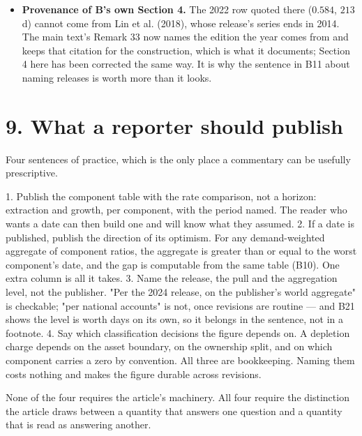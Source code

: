 \documentclass[11pt]{article}
\begin{document}
\begin{itemize}
\item \textbf{Provenance of B's own Section 4.} The 2022 row quoted there (\(0.584\), \(213\) d) cannot come from Lin et al. (2018), whose release's series ends in 2014. The main text's Remark 33 now names the edition the year comes from and keeps that citation for the construction, which is what it documents; Section 4 here has been corrected the same way. It is why the sentence in B11 about naming releases is worth more than it looks.
\end{itemize}

\vspace{0.8em}

\vspace{0.8em}

\section*{9. What a reporter should publish}\label{9-what-a-reporter-should-publish}

Four sentences of practice, which is the only place a commentary can be usefully prescriptive.

1. Publish the component table with the rate comparison, not a horizon: extraction and growth, per component, with the period named. The reader who wants a date can then build one and will know what they assumed. 2. If a date is published, publish the direction of its optimism. For any demand-weighted aggregate of component ratios, the aggregate is greater than or equal to the worst component's date, and the gap is computable from the same table (B10). One extra column is all it takes. 3. Name the release, the pull and the aggregation level, not the publisher. "Per the 2024 release, on the publisher's world aggregate" is checkable; "per national accounts" is not, once revisions are routine --- and B21 shows the level is worth days on its own, so it belongs in the sentence, not in a footnote. 4. Say which classification decisions the figure depends on. A depletion charge depends on the asset boundary, on the ownership split, and on which component carries a zero by convention. All three are bookkeeping. Naming them costs nothing and makes the figure durable across revisions.

None of the four requires the article's machinery. All four require the distinction the article draws between a quantity that answers one question and a quantity that is read as answering another.

\vspace{0.8em}
\end{document}
